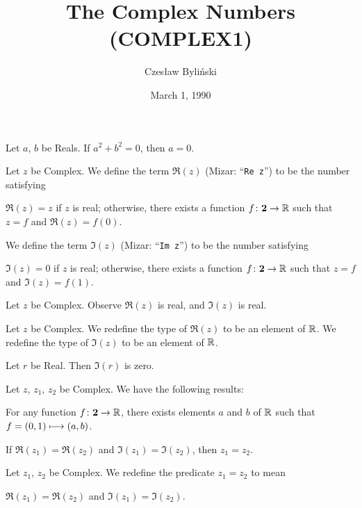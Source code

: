 \documentclass{article}
\title{The Complex Numbers (COMPLEX1)}
\author{Czes{\l}aw Byli\'nski}
\date{March 1, 1990}
\begin{document}
\maketitle

\begin{thm}
\item\label{complex1:1} Let $a$, $b$ be Reals.
  If $a^{2}+b^{2}=0$, then $a=0$.
\end{thm}

\begin{definition}
Let $z$ be Complex.
We define the term $\Re(z)$ (Mizar: ``\verb#Re z#'') to be the number
satisfying
\begin{defn}
\item $\Re(z)=z$ if $z$ is real; otherwise, there exists a function
  $f\colon\mathbf{2}\to\mathbb{R}$ such that $z=f$ and $\Re(z)=f(0)$.
\end{defn}
We define the term $\Im(z)$ (Mizar: ``\verb#Im z#'') to be the number
satisfying
\begin{defn}
\item $\Im(z)=0$ if $z$ is real; otherwise, there exists a function
  $f\colon\mathbf{2}\to\mathbb{R}$ such that $z=f$ and $\Im(z)=f(1)$.
\end{defn}
\end{definition}

Let $z$ be Complex. Observe $\Re(z)$ is real, and $\Im(z)$ is real.

\begin{definition}
Let $z$ be Complex.
We redefine the type of $\Re(z)$ to be an element of $\mathbb{R}$.
We redefine the type of $\Im(z)$ to be an element of $\mathbb{R}$.
\end{definition}

Let $r$ be Real. Then $\Im(r)$ is zero.

Let $z$, $z_{1}$, $z_{2}$ be Complex.
We have the following results:
\begin{thm}
\item\label{complex1:2} For any function $f\colon\mathbf{2}\to\mathbb{R}$,
  there exists elements $a$ and $b$ of $\mathbb{R}$  such that
  $f = (0,1)\longmapsto(a,b)$.
\item\label{complex1:3} If $\Re(z_{1})=\Re(z_{2})$ and $\Im(z_{1})=\Im(z_{2})$,
  then $z_{1}=z_{2}$.
\end{thm}

\begin{definition}
Let $z_{1}$, $z_{2}$ be Complex.
We redefine the predicate $z_{1}=z_{2}$ to mean
\begin{defn}
\item $\Re(z_{1})=\Re(z_{2})$ and $\Im(z_{1})=\Im(z_{2})$.
\end{defn}
\end{definition}
\end{document}

